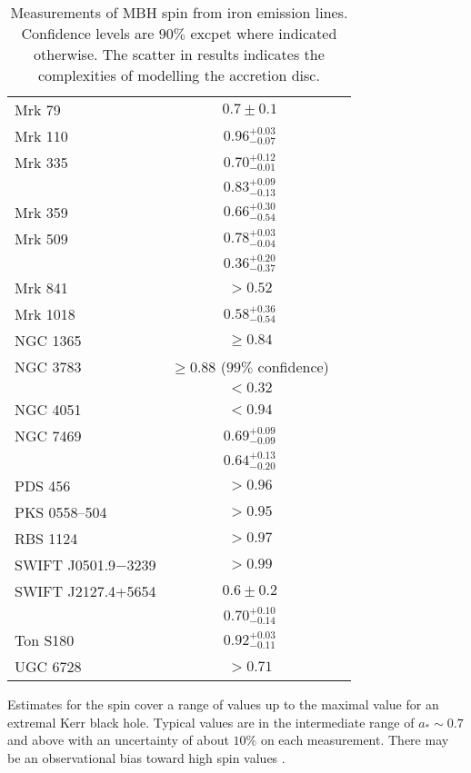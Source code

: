 {\begin{table}[htp]
\begin{tabular}{l c l }
Mrk 79 & $0.7 \pm 0.1$ & \citet{Gallo2011} \\ %
Mrk 110 & $0.96^{+0.03}_{-0.07}$ & \citet{Walton2013} \\ %
Mrk 335 & $0.70^{+0.12}_{-0.01}$ & \citet{Patrick2011} \\ %
 & $0.83^{+0.09}_{-0.13}$ & \citet{Walton2013} \\ %
Mrk 359 & $0.66^{+0.30}_{-0.54}$ & \citet{Walton2013} \\ %
Mrk 509 & $0.78^{+0.03}_{-0.04}$ & \citet{delaCallePerez2010} \\ %
 & $0.36^{+0.20}_{-0.37}$ & \citet{Walton2013} \\ %
Mrk 841 & $>0.52$ & \citet{Walton2013} \\ %
Mrk 1018 & $0.58^{+0.36}_{-0.54}$ & \citet{Walton2013} \\ %
NGC 1365 & $\geq 0.84$ & \citet{Risaliti2013} \\ %
NGC 3783 & $\geq 0.88$ ($99\%$ confidence) & \citet{Brenneman2011} \\ %
 & $< 0.32$ & \citet{Patrick2011a} \\ %
NGC 4051 & $< 0.94$ & \citet{Patrick2011a} \\ %
NGC 7469 & $0.69^{+0.09}_{-0.09}$ & \citet{Patrick2011} \\ %
 & $0.64^{+0.13}_{-0.20}$ & \citet{Walton2013} \\ %
PDS 456 & $>0.96$ & \citet{Walton2013} \\ %
PKS 0558--504 & $>0.95$ & \citet{Walton2013} \\ %
RBS 1124 & $>0.97$ & \citet{Walton2013} \\ %
SWIFT J0501.9$-$3239 & $>0.99$ & \citet{Walton2013} \\ %
SWIFT J2127.4+5654 & $0.6 \pm 0.2$ & \citet{Miniutti2009} \\ %
 & $0.70^{+0.10}_{-0.14}$ & \citet{Patrick2011} \\ %
Ton S180 & $0.92^{+0.03}_{-0.11}$ & \citet{Walton2013} \\ %
UGC 6728 & $>0.71$ & \citet{Walton2013} \\ %
 \bottomrule
\end{tabular}
\caption{Measurements of MBH spin from iron emission lines. Confidence levels are $90\%$ excpet where indicated otherwise. The scatter in results indicates the complexities of modelling the accretion disc.\label{tab:X-ray}}
\end{table}
Estimates for the spin cover a range of values up to the maximal value for an extremal Kerr black hole. Typical values are in the intermediate range of $a_\ast \sim 0.7$ and above with an uncertainty of about $10\%$ on each measurement. There may be an observational bias toward high spin values \citep{Brenneman2011}.

}
